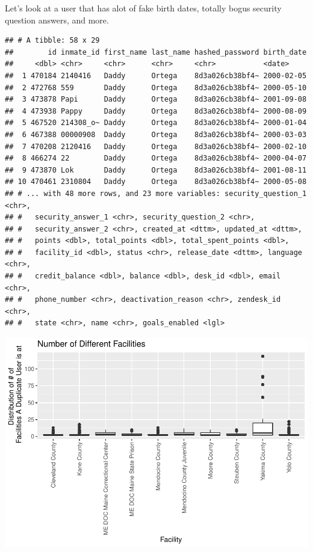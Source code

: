 \documentclass[
]{article}
\begin{document}
Let's look at a user that has alot of fake birth dates, totally bogus
security question answers, and more.

\begin{verbatim}
## # A tibble: 58 x 29
##        id inmate_id first_name last_name hashed_password birth_date
##     <dbl> <chr>     <chr>      <chr>     <chr>           <date>    
##  1 470184 2140416   Daddy      Ortega    8d3a026cb38bf4~ 2000-02-05
##  2 472768 559       Daddy      Ortega    8d3a026cb38bf4~ 2000-05-10
##  3 473878 Papi      Daddy      Ortega    8d3a026cb38bf4~ 2001-09-08
##  4 473938 Pappy     Daddy      Ortega    8d3a026cb38bf4~ 2000-08-09
##  5 467520 214308_o~ Daddy      Ortega    8d3a026cb38bf4~ 2000-01-04
##  6 467388 00000908  Daddy      Ortega    8d3a026cb38bf4~ 2000-03-03
##  7 470208 2120416   Daddy      Ortega    8d3a026cb38bf4~ 2000-02-10
##  8 466274 22        Daddy      Ortega    8d3a026cb38bf4~ 2000-04-07
##  9 473870 Lok       Daddy      Ortega    8d3a026cb38bf4~ 2001-08-11
## 10 470461 2310804   Daddy      Ortega    8d3a026cb38bf4~ 2000-05-08
## # ... with 48 more rows, and 23 more variables: security_question_1 <chr>,
## #   security_answer_1 <chr>, security_question_2 <chr>,
## #   security_answer_2 <chr>, created_at <dttm>, updated_at <dttm>,
## #   points <dbl>, total_points <dbl>, total_spent_points <dbl>,
## #   facility_id <dbl>, status <chr>, release_date <dttm>, language <chr>,
## #   credit_balance <dbl>, balance <dbl>, desk_id <dbl>, email <chr>,
## #   phone_number <chr>, deactivation_reason <chr>, zendesk_id <chr>,
## #   state <chr>, name <chr>, goals_enabled <lgl>
\end{verbatim}

\includegraphics{report_8-5_files/figure-latex/unnamed-chunk-10-1.pdf}
\end{document}
